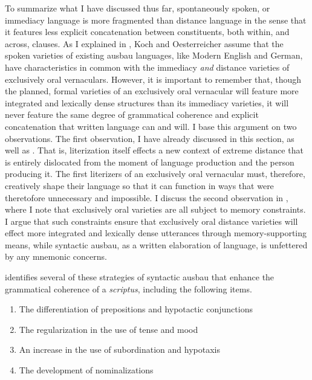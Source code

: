 To summarize what I have discussed thus far, spontaneously spoken, or immediacy language is more fragmented than distance language in the sense that it features less explicit concatenation between constituents, both within, and across, clauses. As I explained in , Koch and Oesterreicher assume that the spoken varieties of existing ausbau languages, like Modern English and German, have characteristics in common with the immediacy \textit{and} distance varieties of exclusively oral vernaculars. However, it is important to remember that, though the planned, formal varieties of an exclusively oral vernacular will feature more integrated and lexically dense structures than its immediacy varieties, it will never feature the same degree of grammatical coherence and explicit concatenation that written language can and will. I base this argument on two observations. The first observation, I have already discussed in this section, as well as . That is, literization itself effects a new context of extreme distance that is entirely dislocated from the moment of language production and the person producing it. The first literizers of an exclusively oral vernacular must, therefore, creatively shape their language so that it can function in ways that were theretofore unnecessary and impossible. I discuss the second observation in , where I note that exclusively oral varieties are all subject to memory constraints. I argue that such constraints ensure that exclusively oral distance varieties will effect more integrated and lexically dense utterances through memory-supporting means, while syntactic ausbau, as a written elaboration of language, is unfettered by any mnemonic concerns.

\citet[591]{KochOesterreicher1994} identifies several of these strategies of syntactic ausbau that enhance the grammatical coherence of a \textit{scriptus}, including the following items.

\begin{enumerate}
\item  The differentiation of prepositions and hypotactic conjunctions
\item  The regularization in the use of tense and mood
\item  An increase in the use of subordination and hypotaxis
\item  The development of nominalizations
\end{enumerate}

